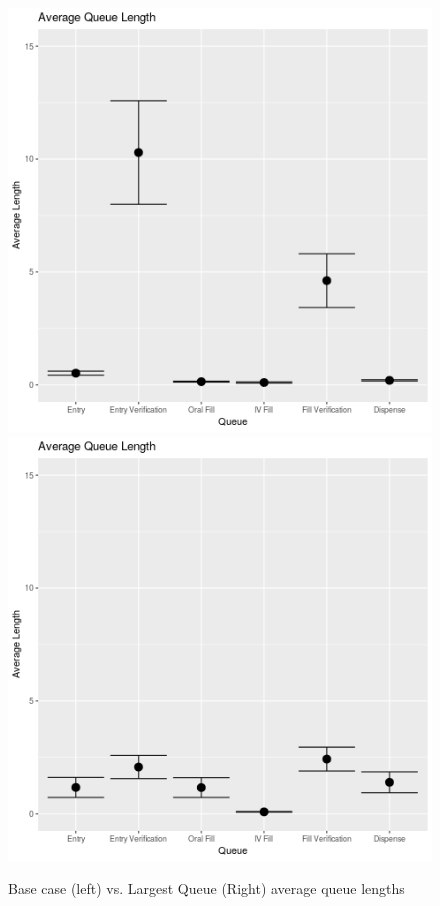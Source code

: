 \documentclass[10pt]{report}            %
\begin{document}
\begin{figure}[H]
\centering
\includegraphics[scale=.35]{BaseQueueCIs.png}
\includegraphics[scale=.35]{LongestQueueCIs.png}
\caption{Base case (left) vs. Largest Queue (Right) average queue lengths}
\label{fig:basevlong}
\end{figure}
\end{document}
